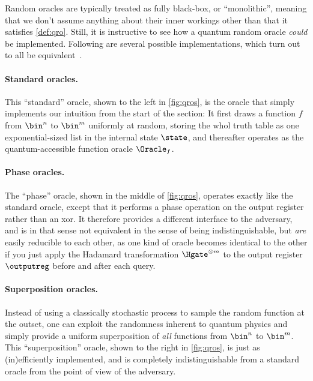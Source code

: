     Random oracles are typically treated as fully black-box, or ``monolithic'',
      meaning that we don't assume anything about their inner workings other
      than that it satisfies \autoref{def:qro}. Still, it is
      instructive to see how a quantum random oracle \emph{could} be
      implemented. Following are several possible implementations, which turn
      out to all be equivalent~\cite{C:Zhandry19}.

    \paragraph{Standard oracles.}
      This ``standard'' oracle, shown to the left in \autoref{fig:qros}, is the
        oracle that simply implements our
        intuition from the start of the section: It first 
        draws a function $f$ from $\bin^n$ to $\bin^m$ uniformly at random, storing
        the whol truth table as one exponential-sized list in the internal
        state $\state$, and thereafter operates as the quantum-accessible
        function oracle $\Oracle_f$.

    \paragraph{Phase oracles.}
      The ``phase'' oracle, shown in the middle of \autoref{fig:qros}, operates
        exactly like the standard oracle, except that it
        performs a phase operation on the output register rather than an xor.
        It therefore provides a different interface to the adversary, and
        is in that sense not equivalent in the sense of being
        indistinguishable, but \emph{are} easily reducible to each other, as
        one kind of oracle becomes identical to the other if you just apply the Hadamard
        transformation $\Hgate^{\otimes m}$ to the output register $\outputreg$
        before and after each query.

    \paragraph{Superposition oracles.}
      Instead of using a classically stochastic process to sample the random
        function at the outset, one can exploit the randomness inherent to
        quantum physics and simply provide a uniform superposition of
        \emph{all} functions from $\bin^n$ to $\bin^m$. This ``superposition''
        oracle, shown to the right in \autoref{fig:qros}, is just as
        (in)efficiently implemented, and is completely indistinguishable from a
        standard oracle from the point of view of the adversary. 

